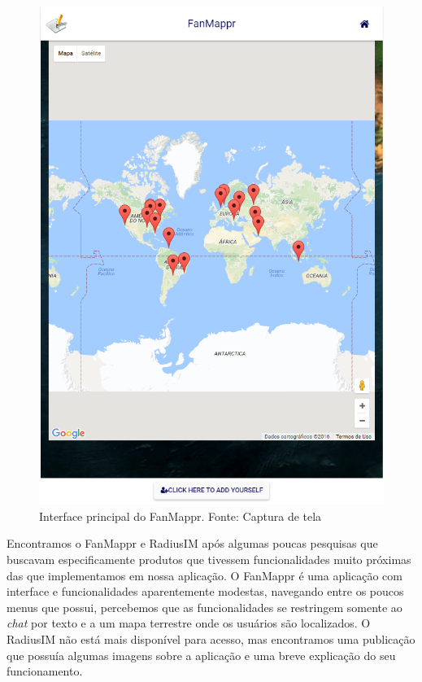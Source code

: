 \begin{figure}[!b]
	\centering
	\includegraphics[scale=0.5]{imagens/fanmappr.png}
	\caption{\small Interface principal do FanMappr. Fonte: Captura de tela}
	\label{fig:fanmappr-principal}
\end{figure}

Encontramos o FanMappr e RadiusIM após algumas poucas pesquisas que buscavam especificamente produtos que tivessem funcionalidades muito próximas das que implementamos em nossa aplicação. O FanMappr é uma aplicação com interface e funcionalidades aparentemente modestas, navegando entre os poucos menus que possui, percebemos que as funcionalidades se restringem somente ao \textit{chat} por texto e a um mapa terrestre onde os usuários são localizados. O RadiusIM não está mais disponível para acesso, mas encontramos uma publicação \cite{radiusim} que possuía algumas imagens sobre a aplicação e uma breve explicação do seu funcionamento.


